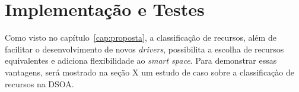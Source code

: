 \chapter{Implementação e Testes}

Como visto no capítulo~\ref{cap:proposta}, a classificação de recursos, além de facilitar o desenvolvimento de novos \emph{drivers}, possibilita a escolha de recursos equivalentes e adiciona flexibilidade ao \emph{smart space}. Para demonstrar essas vantagens, será mostrado na seção X um estudo de caso sobre a classificaçào de recursos na DSOA.



